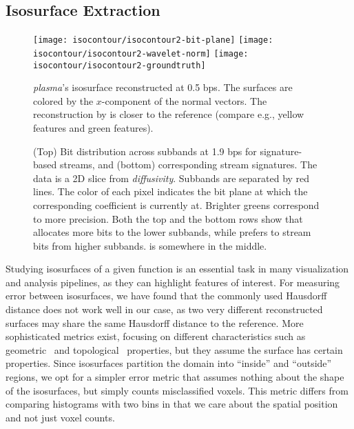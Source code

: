 \subsection{Isosurface Extraction}\label{sec:isocontour}

\begin{figure}[t]
\centering
{}
{\texttt{[image: isocontour/isocontour2-bit-plane]}}
{\texttt{[image: isocontour/isocontour2-wavelet-norm]}}
{\texttt{[image: isocontour/isocontour2-groundtruth]}}
\caption{\emph{plasma}'s isosurface reconstructed at 0.5 bps. The surfaces are colored by the
$x$-component of the normal vectors. The reconstruction by \sbit is closer to the reference (compare
e.g., yellow features and green features).}
\label{fig:isocontour-surfaces-plasma}
\vspace{-1em}
\end{figure}

\begin{figure}[t]
\centering
\caption{(Top) Bit distribution across subbands at 1.9 bps for signature-based streams, and (bottom)
corresponding stream signatures. The data is a 2D slice from \emph{diffusivity}. Subbands are
separated by red lines. The color of each pixel indicates the bit plane at which the corresponding
coefficient is currently at. Brighter greens correspond to more precision. Both the top and the
bottom rows show that \shsg allocates more bits to the lower subbands, while \slsg prefers to stream
bits from higher subbands. \srsg is somewhere in the middle.}
\label{fig:bit-distrib}
\vspace{-1em}
\end{figure}

Studying isosurfaces of a given function is an essential task in many visualization and analysis
pipelines, as they can highlight features of interest. For measuring error between isosurfaces, we
have found that the commonly used Hausdorff distance does not work well in our case, as two very
different reconstructed surfaces may share the same Hausdorff distance to the reference. More
sophisticated metrics exist, focusing on different characteristics such as
geometric~\cite{verifiable-isosurface} and topological~\cite{topology-verification-isosurface}
properties, but they assume the surface has certain properties. Since isosurfaces partition the
domain into ``inside'' and ``outside'' regions, we opt for a simpler error metric that assumes
nothing about the shape of the isosurfaces, but simply counts misclassified voxels. This metric
differs from comparing histograms with two bins in that we care about the spatial position and not
just voxel counts.

